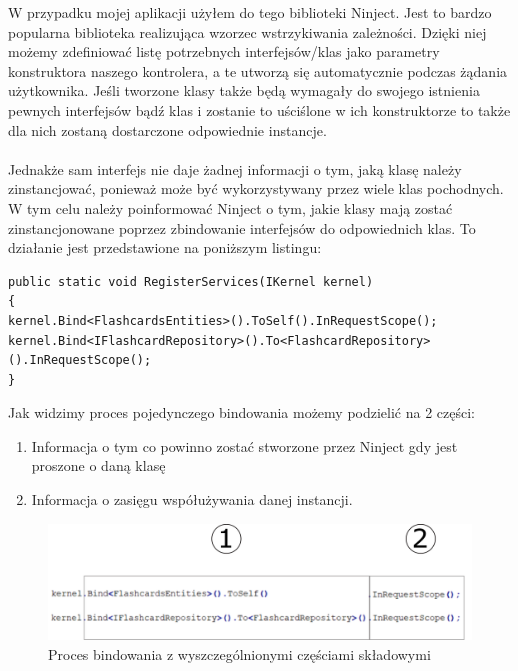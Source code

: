 W przypadku mojej aplikacji użyłem do tego biblioteki Ninject\cite{NinjectGithub}. Jest to bardzo popularna biblioteka realizująca wzorzec wstrzykiwania zależności. Dzięki niej możemy zdefiniować listę potrzebnych interfejsów/klas jako parametry konstruktora naszego kontrolera, a te utworzą się automatycznie podczas żądania użytkownika. Jeśli tworzone klasy także będą wymagały do swojego istnienia pewnych interfejsów bądź klas i zostanie to uściślone w ich konstruktorze to także dla nich zostaną dostarczone odpowiednie instancje.
\\ \\
Jednakże sam interfejs nie daje żadnej informacji o tym, jaką klasę należy zinstancjować, ponieważ może być wykorzystywany przez wiele klas pochodnych. W tym celu należy poinformować Ninject o tym, jakie klasy mają zostać zinstancjonowane poprzez zbindowanie interfejsów do odpowiednich klas. To działanie jest przedstawione na poniższym listingu:

\begin{lstlisting}[frame=single, numbers=none,captionpos=b, 
caption={Przykładowy kod bindowania dla biblioteki Ninject}]
public static void RegisterServices(IKernel kernel)
{
kernel.Bind<FlashcardsEntities>().ToSelf().InRequestScope();
kernel.Bind<IFlashcardRepository>().To<FlashcardRepository>().InRequestScope();
}
\end{lstlisting}

Jak widzimy proces pojedynczego bindowania możemy podzielić na 2 części:

\begin{enumerate}
	\item Informacja o tym co powinno zostać stworzone przez Ninject gdy jest proszone o daną klasę
	\item Informacja o zasięgu współużywania danej instancji.
\end{enumerate}

\begin{figure}[h]
	\centering
	\includegraphics[width=\textwidth]{images/ninject.png}
	 \caption{Proces bindowania z wyszczególnionymi częściami składowymi}
\end{figure}


